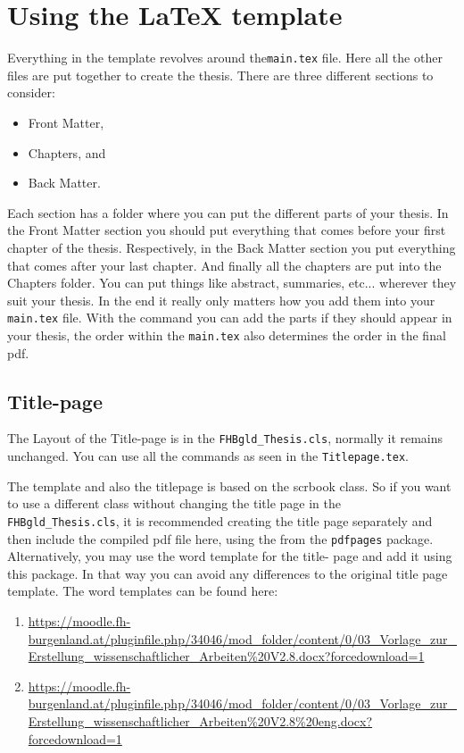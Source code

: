 \section{Using the \LaTeX{} template}

Everything in the template revolves around the\verb|main.tex| file. Here all the other files are put together to create the thesis.
There are three different sections to consider: 
\begin{itemize}
	\item Front Matter,
	\item Chapters, and
	\item Back Matter.
\end{itemize}
Each section has a folder where you can put the different parts of your thesis. In the Front Matter section you should put everything that comes before your first chapter of the thesis. Respectively, in the Back Matter section you put everything that comes after your last chapter. And finally all the chapters are put into the Chapters folder. You can put things like abstract, summaries, etc... wherever they suit your thesis. In the end it really only matters how you add them into your \verb|main.tex| file. With the \verb|| command you can add the parts if they should appear in your thesis, the order within the \verb|main.tex| also determines the order in the final pdf.

\subsection{Title-page}
The Layout of the Title-page is in the \verb|FHBgld_Thesis.cls|, normally it remains unchanged. You can use all the commands as seen in the \verb|Titlepage.tex|. 

The template and also the titlepage is based on the scrbook class. So if you want to use a different class without changing the title page in the \verb|FHBgld_Thesis.cls|, it is recommended creating the title page separately and then include the compiled pdf file here, using the 
\verb|| from the \verb|pdfpages| package. Alternatively, you may use the word template for the title- page and add it using this package. In that way you can avoid any differences to the original title page template. The word templates can be found here:
\begin{enumerate}
	\item \url{https://moodle.fh-burgenland.at/pluginfile.php/34046/mod_folder/content/0/03_Vorlage_zur_Erstellung_wissenschaftlicher_Arbeiten\%20V2.8.docx?forcedownload=1}
	\item \url{https://moodle.fh-burgenland.at/pluginfile.php/34046/mod_folder/content/0/03_Vorlage_zur_Erstellung_wissenschaftlicher_Arbeiten\%20V2.8\%20eng.docx?forcedownload=1}
\end{enumerate}

